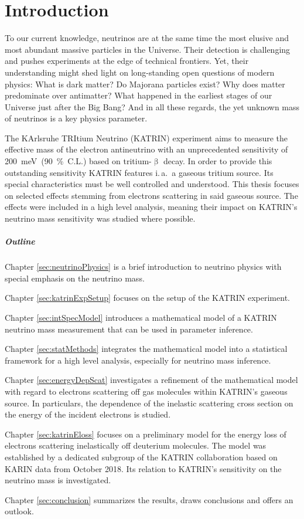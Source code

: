 \chapter{Introduction}
To our current knowledge, neutrinos are at the same time the most elusive and most abundant massive particles in the Universe. Their detection is challenging and pushes experiments at the edge of technical frontiers. Yet, their understanding might shed light on long-standing open questions of modern physics: What is dark matter? Do Majorana particles exist? Why does matter predominate over antimatter? What happened in the earliest stages of our Universe just after the Big Bang? And in all these regards, the yet unknown mass of neutrinos is a key physics parameter.

The KArlsruhe TRItium Neutrino (KATRIN) experiment aims to measure the effective mass of the electron antineutrino with an unprecedented sensitivity of \mbox{\SI{200}{meV} (\SI{90}{\percent} C.L.)} based on tritium-$\upbeta$ decay. In order to provide this outstanding sensitivity KATRIN features i.\,a.~a gaseous tritium source. Its special characteristics must be well controlled and understood. This thesis focuses on selected effects stemming from electrons scattering in said gaseous source. The effects were included in a high level analysis, meaning their impact on KATRIN's neutrino mass sensitivity was studied where possible.

\paragraph{Outline}
Chapter \ref{sec:neutrinoPhysics} is a brief introduction to neutrino physics with special emphasis on the neutrino mass.

Chapter \ref{sec:katrinExpSetup} focuses on the setup of the KATRIN experiment.


Chapter \ref{sec:intSpecModel} introduces a mathematical model of a KATRIN neutrino mass measurement that can be used in parameter inference.

Chapter \ref{sec:statMethods} integrates the mathematical model into a statistical framework for a high level analysis, especially for neutrino mass inference.

Chapter \ref{sec:energyDepScat} investigates a refinement of the mathematical model with regard to electrons scattering off gas molecules within KATRIN's gaseous source. In particulars, the dependence of the inelastic scattering cross section on the energy of the incident electrons is studied.

Chapter \ref{sec:katrinEloss} focuses on a preliminary model for the energy loss of electrons scattering inelastically off deuterium molecules. The model was established by a dedicated subgroup of the KATRIN collaboration based on KARIN data from October 2018. Its relation to KATRIN's sensitivity on the neutrino mass is investigated.

Chapter \ref{sec:conclusion} summarizes the results, draws conclusions and offers an outlook.